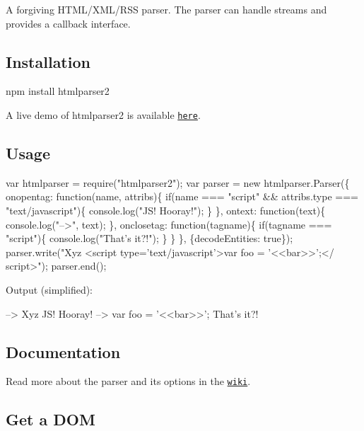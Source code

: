 \href{https://npmjs.org/package/htmlparser2}{\tt } \href{https://npmjs.org/package/htmlparser2}{\tt } \href{http://travis-ci.org/fb55/htmlparser2}{\tt } \href{https://coveralls.io/r/fb55/htmlparser2}{\tt }

A forgiving H\+T\+M\+L/\+X\+M\+L/\+R\+SS parser. The parser can handle streams and provides a callback interface.

\subsection*{Installation}

npm install htmlparser2

A live demo of htmlparser2 is available \href{http://demos.forbeslindesay.co.uk/htmlparser2/}{\tt here}.

\subsection*{Usage}


\begin{DoxyCode}
var htmlparser = require("htmlparser2");
var parser = new htmlparser.Parser(\{
  onopentag: function(name, attribs)\{
    if(name === "script" && attribs.type === "text/javascript")\{
      console.log("JS! Hooray!");
    \}
  \},
  ontext: function(text)\{
    console.log("-->", text);
  \},
  onclosetag: function(tagname)\{
    if(tagname === "script")\{
      console.log("That's it?!");
    \}
  \}
\}, \{decodeEntities: true\});
parser.write("Xyz <script type='text/javascript'>var foo = '<<bar>>';</ script>");
parser.end();
\end{DoxyCode}


Output (simplified)\+:


\begin{DoxyCode}
--> Xyz 
JS! Hooray!
--> var foo = '<<bar>>';
That's it?!
\end{DoxyCode}


\subsection*{Documentation}

Read more about the parser and its options in the \href{https://github.com/fb55/htmlparser2/wiki/Parser-options}{\tt wiki}.

\subsection*{Get a D\+OM}

